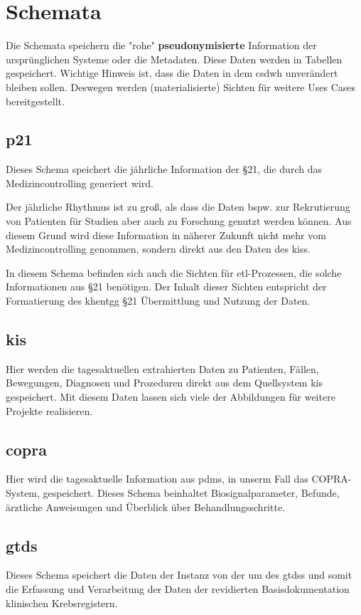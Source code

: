 \chapter{Schemata}
\label{ch:schema}

	Die Schemata speichern die "rohe" \textbf{pseudonymisierte} Information der ursprünglichen Systeme oder die Metadaten. Diese Daten werden in Tabellen gespeichert. Wichtige Hinweis ist, dass die Daten in dem \ac{csdwh} unverändert bleiben sollen. Deswegen werden (materialisierte) Sichten für weitere Uses Cases bereitgestellt. 

  \section{p21} \label{sc:p21}
  Dieses Schema speichert die jährliche Information der \S21, die durch das Medizincontrolling generiert wird. 
  
  Der jährliche Rhythmus ist zu groß, als dass die Daten bspw. zur Rekrutierung von Patienten für Studien aber auch zu Forschung genutzt werden können. Aus diesem Grund wird diese Information in näherer Zukunft nicht mehr vom Medizincontrolling genommen, sondern direkt aus den Daten des \ac{kiss}.
  
  In diesem Schema befinden sich auch die Sichten für \ac{etl}-Prozessen, die solche Informationen aus \S21 benötigen. Der Inhalt dieser Sichten entspricht der Formatierung des \ac{khentgg} \S 21 Übermittlung und Nutzung der Daten.

  \section{kis} \label{sc:kis}
   Hier werden die tagesaktuellen extrahierten Daten zu Patienten, Fällen, Bewegungen, Diagnosen und Prozeduren direkt aus dem Quellsystem \ac{kis} gespeichert. Mit diesem Daten lassen sich viele der Abbildungen für weitere Projekte realisieren.
  
  \section{copra} \label{sc:copra}
  Hier wird die tagesaktuelle Information aus \ac{pdms}, in unserm Fall das COPRA-System, gespeichert. Dieses Schema beinhaltet Biosignalparameter, Befunde, ärztliche Anweisungen und Überblick über Behandlungsschritte.


  \section{gtds} \label{sc:gtds}
  Dieses Schema speichert die Daten der Instanz von der \ac{um} des \acf{gtdss} und somit die Erfassung und Verarbeitung der Daten der revidierten Basisdokumentation klinischen Krebsregistern.

